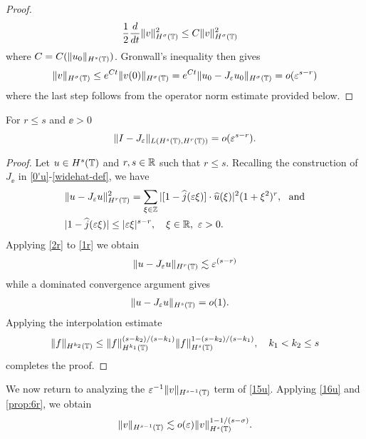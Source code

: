 \begin{proof}
\begin{equation*}
\begin{split}
\label{12x}
\frac{1}{2}\frac{d}{dt} \|v\|_{H^{\sigma}(\mathbb{T})}^2
& \le
C \|v\|_{H^{\sigma}(\mathbb{T})}^2
\end{split}
\end{equation*}
%
%
where $C = C(\|u_0\|_{H^s(\mathbb{T})})$. Gronwall's inequality then gives
%
%
%
\begin{equation*}
\label{conc-lemma}
\begin{split}
\|v\|_{H^{\sigma}(\mathbb{T})}
 \le e^{C t}\|v(0)\|_{H^{\sigma}(\mathbb{T})}
 = e^{C t}\|u_0 - J_\varepsilon u_0 \|_{H^{\sigma}(\mathbb{T})} = o(\varepsilon^{s-r})
\end{split}
\end{equation*}
%
%
%
%
%
where the last step follows from the operator norm estimate provided below. 
\end{proof}
%
%
\begin{lemma}
\label{lem4r}
For $r \le s$ and $\ee>0$
%
%
\begin{equation}
\label{0r}
\begin{split}
\|I - J_\varepsilon\|_{L(H^s(\mathbb{T}), H^r(\mathbb{T}))} = o(\varepsilon^{s-r}).
\end{split}
\end{equation}
%
%
\end{lemma}
%
%
\begin{proof}
Let $u \in H^s(\mathbb{T})$ and $r, s \in \mathbb{R}$ such that $r \le s$. 
Recalling the construction of $J_\ee$ in
\eqref{0'u}-\eqref{widehat-def}, we have
%
%
\begin{align}
\label{1r}
& \|u - J_\varepsilon u\|_{H^r(\mathbb{T})}^2 = \sum_{\xi \in \mathbb{Z}} | [1- \widehat{j}(\varepsilon 
\xi)] \cdot \widehat{u}(\xi) |^2
(1+\xi^2)^r, \ \ \text{and}
\\
& |1 - \widehat{j}(\varepsilon \xi)| \le |\varepsilon \xi |^{s-r}, \quad 
\xi \in \mathbb{R}, \ \varepsilon > 0.
\label{2r}
\end{align}
%
%
Applying \eqref{2r} to \eqref{1r} we obtain
%
%
\begin{equation*}
\label{2pr}
\begin{split}
\|u - J_\varepsilon u\|_{H^r(\mathbb{T})}
\lesssim \varepsilon^{(s-r)}
\end{split}
\end{equation*}
%
%
%
%
while a dominated convergence argument gives
%
%
\begin{equation*}
\label{o1}
\begin{split}
\|u - J_\varepsilon u \|_{H^s(\mathbb{T}) } & = o(1).
\end{split}
\end{equation*}
%
%
%
%
Applying the interpolation estimate 
%
%
\begin{equation}
\begin{split}
\|f\|_{H^{k_2}(\mathbb{T})} \le
\|f\|_{H^{k_1}(\mathbb{T})}^{(s-k_2)/(s -k_1 )}
\|f\|_{H^s(\mathbb{T})}^{1 - (s-k_2)/(s -k_1 )}, \quad k_1 < k_2 \le s
\label{16u}
\end{split}
\end{equation}
%
%
%
%
%
%
completes the proof. 
%
\end{proof}
We now return to analyzing the $\varepsilon^{-1}
\|v\|_{H^{s-1}(\mathbb{T})} $ term of \eqref{15u}.
Applying \eqref{16u} and \cref{prop:6r}, 
we obtain
%
%
%
%
$$
\|v\|_{H^{s-1}(\mathbb{T})}  \lesssim o(\varepsilon) 
\|v\|_{H^s(\mathbb{T})}^{1-
1/(s- \sigma)}.
$$

